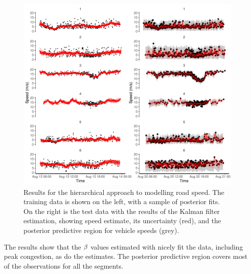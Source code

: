 \begin{knitrout}\small
{}\color{fgcolor}\begin{figure}
\includegraphics[width=\textwidth]{figure/nw_model_n2_kf-1} \caption[Results for the hierarchical approach to modelling road speed]{Results for the hierarchical approach to modelling road speed. The training data is shown on the left, with a sample of posterior fits. On the right is the test data with the results of the Kalman filter estimation, showing speed estimate, its uncertainty (red), and the posterior predictive region for vehicle speeds (grey).}\label{fig:nw_model_n2_kf}
\end{figure}


\end{knitrout}

The results show that the $\beta$ values estimated with  nicely fit the data, including peak congestion, as do the \kf{} estimates. The posterior predictive region covers most of the observations for all the segments.
